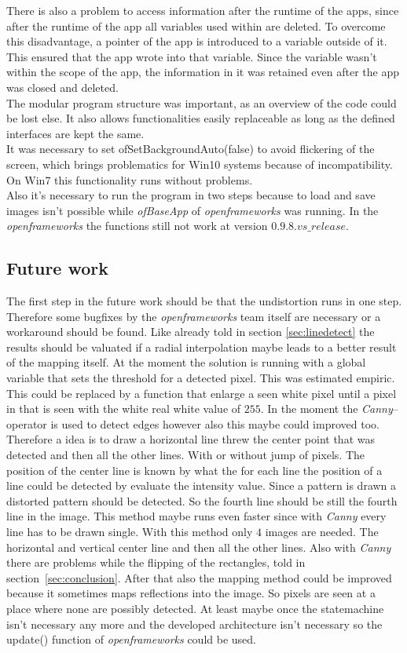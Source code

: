 \documentclass[journal,final,a4paper,twoside]{PS}
\begin{document}
There is also a problem to access information after the runtime of the apps, since after the runtime of the app all variables used within are deleted. To overcome this disadvantage, a pointer of the app is introduced to a variable outside of it. This ensured that the app wrote into that variable. Since the variable wasn't within the scope of the app, the information in it was retained even after the app was closed and deleted.\\
The modular program structure was important, as an overview of the code could be lost else. It also allows functionalities easily replaceable as long as the defined interfaces are kept the same.
\\
It was necessary to set ofSetBackgroundAuto(false) to avoid flickering of the screen, which brings problematics for Win10 systems because of incompatibility. On Win7 this functionality runs without problems. \\
Also it's necessary to run the program in two steps because to load and save images isn't possible while \emph{ofBaseApp} of \emph{openframeworks} was running. In the \emph{openframeworks} the functions still not work at version $0.9.8.vs\_release$.


\subsection{Future work}
\label{sec:future}
The first step in the future work should be that the undistortion runs in one step. Therefore some bugfixes by the \emph{openframeworks} team itself are necessary or a workaround should be found. Like already told in section \ref{sec:linedetect} the results should be valuated if a radial interpolation maybe leads to a better result of the mapping itself. At the moment the solution is running with a global variable that sets the threshold for a detected pixel. This was estimated empiric. This could be replaced by a function that enlarge a seen white pixel until a pixel in that is seen with the white real white value of $255$. In the moment the \emph{Canny}--operator is used to detect edges however also this maybe could improved too. Therefore a idea is to draw a horizontal line threw the center point that was detected and then all the other lines. With or without jump of pixels. The position of the center line is known by what the for each line the position of a line could be detected by evaluate the intensity value. Since a pattern is drawn a distorted pattern should be detected. So the fourth line should be still the fourth line in the image. This method maybe runs even faster since with \emph{Canny} every line has to be drawn single. With this method only $4$ images are needed. The horizontal and vertical center line and then all the other lines. Also with \emph{Canny} there are problems while the flipping of the rectangles, told in section~\ref{sec:conclusion}.
After that also the mapping method could be improved because it sometimes maps reflections into the image. So pixels are seen at a place where none are possibly detected.
At least maybe once the statemachine isn't necessary any more and the developed architecture isn't necessary so the update() function of \emph{openframeworks} could be used.  
\end{document}

